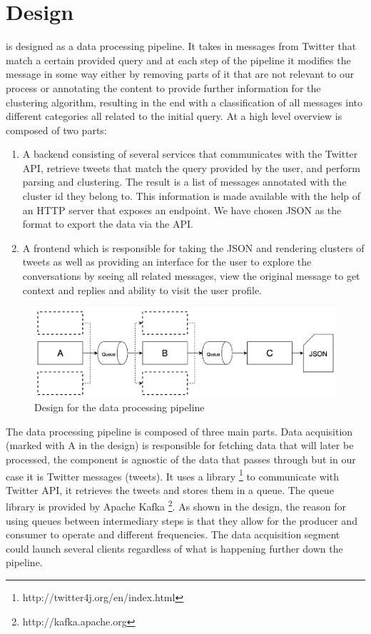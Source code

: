 \chapter{Design}
\label{chapter:design}

{\project} is designed as a data processing pipeline. It takes in messages from Twitter that match a certain provided query and at each step of the pipeline it modifies the message in some way either by removing parts of it that are not relevant to our process or annotating the content to provide further information for the clustering algorithm, resulting in the end with a classification of all messages into different categories all related to the initial query.
At a high level overview {\project}  is composed of two parts:
\begin{enumerate}
  \item A backend consisting of several services that communicates with the Twitter API, retrieve tweets that match the query provided by the user, and perform parsing and clustering. The result is a list of messages annotated with the cluster id they belong to. This information is made available with the help of an HTTP server that exposes an endpoint. We have chosen JSON as the format to export the data via the API.
  \item A frontend which is responsible for taking the JSON and rendering clusters of tweets as well as providing an interface for the user to explore the conversations by seeing all related messages, view the original message to get context and replies and ability to visit the user profile.
\end{enumerate}

\begin{figure}[ht!]
\centering
\includegraphics[width=\textwidth,height=\textheight,keepaspectratio]{src/img/design.png}
\caption{Design for the data processing pipeline\label{overflow}}
\end{figure}

The data processing pipeline is composed of three main parts. Data acquisition (marked with A in the design) is responsible for fetching data that will later be processed, the component is agnostic of the data that passes through but in our case it is Twitter messages (tweets). It uses a library \footnote{http://twitter4j.org/en/index.html} to communicate with Twitter API, it retrieves the tweets and stores them in a queue. The queue library is provided by Apache Kafka \footnote{http://kafka.apache.org}. As shown in the design, the reason for using queues between intermediary steps is that they allow for the producer and consumer to operate and different frequencies. The data acquisition segment could launch several clients regardless of what is happening further down the pipeline.


